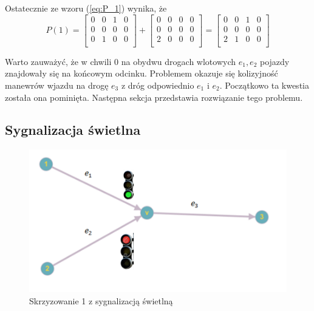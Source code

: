 \documentclass[12pt]{book}
\begin{document}
Ostatecznie ze wzoru (\ref{eq:P_1}) wynika, że
 \[P(1)=\begin{bmatrix}
 0 & 0 & 1 & 0\\
 0 & 0 & 0 & 0\\
 0 & 1 & 0 & 0\\
 \end{bmatrix}+
 \begin{bmatrix}
 0 & 0 & 0 & 0\\
 0 & 0 & 0 & 0\\
 2 & 0 & 0 & 0\\
 \end{bmatrix}=
  \begin{bmatrix}
 0 & 0 & 1 & 0\\
 0 & 0 & 0 & 0\\
 2 & 1 & 0 & 0\\
 \end{bmatrix}
 \]

Warto zauważyć, że w chwili 0 na obydwu drogach wlotowych $e_1,e_2$ pojazdy znajdowały się na końcowym odcinku. Problemem okazuje się kolizyjność manewrów wjazdu na drogę $e_3$ z dróg odpowiednio $e_1$ i $e_2$. Początkowo ta kwestia została ona pominięta. Następna sekcja przedstawia rozwiązanie tego problemu.
\subsection{Sygnalizacja świetlna}
\begin{figure}[H]
  \centering
    \includegraphics[width=14cm]{skrz_1_sygnalizacja}
 \caption{Skrzyzowanie 1 z sygnalizacją świetlną}
 \label{fig:skrz_1_sygnalizacja}
\end{figure}
\end{document}
